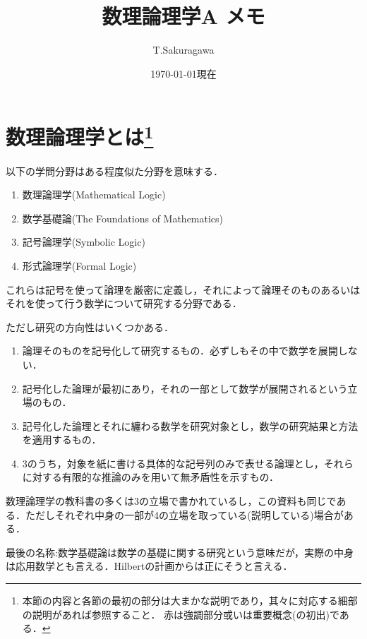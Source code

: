 \documentclass{ltjsarticle}
\theoremstyle{mystyle1}
\theoremstyle{mystyle3}
\theoremstyle{mystyle2}
\newcommand{\red}[1]{{\color{red} #1}}
\begin{document}
\title{数理論理学A メモ}
\author{T.Sakuragawa}
\date{\today 現在}
\maketitle

\setcounter{section}{-1}
\section{数理論理学とは\footnote{本節の内容と各節の最初の部分は大まかな説明であり，其々に対応する細部の説明があれば参照すること． \red{赤}は強調部分或いは重要概念(の初出)である．}}
以下の学問分野はある程度似た分野を意味する．
\begin{enumerate}
  \item 数理論理学(Mathematical Logic)
  \item 数学基礎論(The Foundations of Mathematics)
  \item 記号論理学(Symbolic Logic)
  \item 形式論理学(Formal Logic)
\end{enumerate}
これらは記号を使って論理を厳密に定義し，それによって論理そのものあるいはそれを使って行う数学について研究する分野である．

ただし研究の方向性はいくつかある．
\begin{enumerate}
  \item 論理そのものを記号化して研究するもの．必ずしもその中で数学を展開しない．
  \item 記号化した論理が最初にあり，それの一部として数学が展開されるという立場のもの．
  \item 記号化した論理とそれに纏わる数学を研究対象とし，数学の研究結果と方法を適用するもの．
  \item 3のうち，対象を紙に書ける具体的な記号列のみで表せる論理とし，それらに対する有限的な推論のみを用いて無矛盾性を示すもの．
\end{enumerate}
数理論理学の教科書の多くは3の立場で書かれているし，この資料も同じである．ただしそれぞれ中身の一部が4の立場を取っている(説明している)場合がある．

最後の名称:数学基礎論は数学の基礎に関する研究という意味だが，実際の中身は応用数学とも言える．Hilbertの計画からは正にそうと言える．
\end{document}
